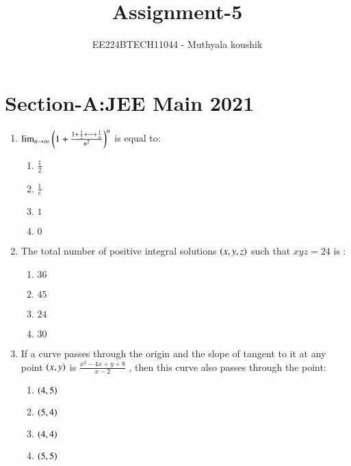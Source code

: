 \documentclass[journal,12pt,onecolumn]{IEEEtran}
\theoremstyle{remark}
\begin{document}

\vspace{3cm}

\title{Assignment-5}
\author{EE224BTECH11044 - Muthyala koushik
}
\maketitle
\bigskip

\renewcommand{\thefigure}{\theenumi}
\renewcommand{\thetable}{\theenumi}

\section{Section-A:JEE Main 2021}
\begin{enumerate}[start=16]
	\item $\lim_{n \to \infty}\left(1+\frac{1+\frac{1}{2}+\dots+\frac{1}{n}}{n^2}\right)^n$ is equal to:
		\begin{enumerate}
			\item $\frac{1}{2}$\\
			\item $\frac{1}{e}$\\
			\item $1$\\
			\item $0$
		\end{enumerate}
	\item The total number of positive integral solutions $\left(x,y,z\right)$ such that $xyz = 24$ is : 
		\begin{enumerate}
			\item $36$\\
			\item $45$\\
			\item $24$\\
			\item $30$
		\end{enumerate}
	\item If a curve passes through the origin and the slope of tangent to it at any point $\left(x,y\right)$ is $\frac{x^2-4x+y+8}{x-2}$ , then this curve also passes through the point:
		\begin{enumerate}
			\item $\left(4, 5\right)$\\
			\item $\left(5, 4\right)$\\
			\item $\left(4, 4\right)$\\
			\item $\left(5, 5\right)$

\end{enumerate}
\end{enumerate}
\end{document}
